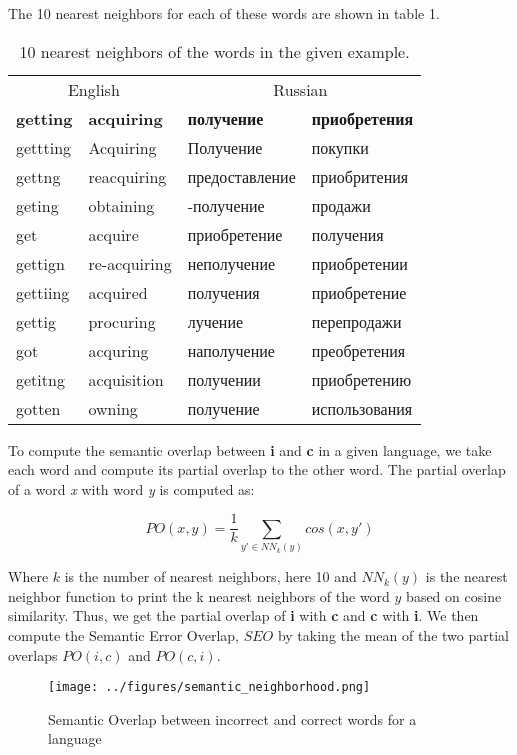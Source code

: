 \documentclass[]{article}
\begin{document}
The 10 nearest neighbors for each of these words are shown in table 1.

\begin{table}[!h]

\caption{\label{tab:unnamed-chunk-4}10 nearest neighbors of the words in the given example.}
\centering
\begin{tabular}[t]{llll}
\toprule
\multicolumn{2}{c}{English} & \multicolumn{2}{c}{Russian} \\
\cmidrule(l{2pt}r{2pt}){1-2} \cmidrule(l{2pt}r{2pt}){3-4}
\textbf{getting} & \textbf{acquiring} & \textbf{получение} & \textbf{приобретения}\\
\midrule
gettting & Acquiring & Получение & покупки\\
gettng & reacquiring & предоставление & приобритения\\
geting & obtaining & -получение & продажи\\
get & acquire & приобретение & получения\\
gettign & re-acquiring & неполучение & приобретении\\
\addlinespace
gettiing & acquired & получения & приобретение\\
gettig & procuring & лучение & перепродажи\\
got & acquring & наполучение & преобретения\\
getitng & acquisition & получении & приобретению\\
gotten & owning & пοлучение & использования\\
\bottomrule
\end{tabular}
\end{table}

To compute the semantic overlap between \textbf{i} and \textbf{c} in a
given language, we take each word and compute its partial overlap to the
other word. The partial overlap of a word \emph{x} with word \emph{y} is
computed as:

\[
  PO(x, y) = \frac{1}{k} \sum_{y' \in NN_k(y)} cos(x, y')
\]

Where \(k\) is the number of nearest neighbors, here 10 and \(NN_k(y)\)
is the nearest neighbor function to print the k nearest neighbors of the
word \(y\) based on cosine similarity. Thus, we get the partial overlap
of \textbf{i} with \textbf{c} and \textbf{c} with \textbf{i}. We then
compute the Semantic Error Overlap, \(SEO\) by taking the mean of the
two partial overlaps \(PO(i, c)\) and \(PO(c, i)\).

\begin{figure}[h]
  \caption {Semantic Overlap between incorrect and correct words for a language}
  \centering
    \texttt{[image: ../figures/semantic\_neighborhood.png]}
\end{figure}
\end{document}
